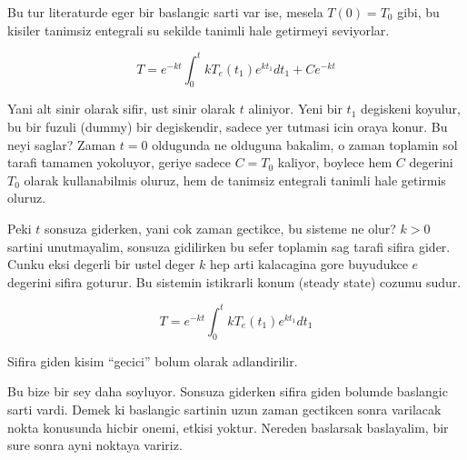 \documentclass[12pt,fleqn]{article}
\begin{document}
Bu tur literaturde eger bir baslangic sarti var ise, mesela $T(0) =
T_0$ gibi, 
bu kisiler tanimsiz entegrali su sekilde tanimli hale getirmeyi seviyorlar. 

\[ T = e^{-kt} \int_0^t kT_e(t_1) e^{kt_1} dt_1 + C e^{-kt} \]

Yani alt sinir olarak sifir, ust sinir olarak $t$ aliniyor. Yeni bir
$t_1$ degiskeni koyulur, bu bir fuzuli (dummy) bir degiskendir, sadece
yer tutmasi icin oraya konur. Bu neyi saglar? Zaman $t=0$ oldugunda ne
olduguna bakalim, o zaman toplamin sol tarafi tamamen yokoluyor,
geriye sadece $C = T_0$ kaliyor, boylece hem $C$ degerini $T_0$ olarak
kullanabilmis oluruz, hem de tanimsiz entegrali tanimli hale getirmis
oluruz. 

Peki $t$ sonsuza giderken, yani cok zaman gectikce, bu sisteme ne
olur? $k > 0$ sartini unutmayalim, sonsuza gidilirken bu sefer
toplamin sag tarafi sifira gider. Cunku eksi degerli bir ustel deger
$k$ hep arti kalacagina gore buyudukce $e$ degerini sifira
goturur. Bu sistemin istikrarli konum (steady state) cozumu sudur.

\[ T = e^{-kt} \int_0^t kT_e(t_1) e^{kt_1} dt_1 \]

Sifira giden kisim ``gecici'' bolum olarak adlandirilir. 

Bu bize bir sey daha soyluyor. Sonsuza giderken sifira giden bolumde
baslangic sarti vardi. Demek ki baslangic sartinin uzun zaman
gectikcen sonra varilacak nokta konusunda hicbir onemi, etkisi
yoktur. Nereden baslarsak baslayalim, bir sure sonra ayni noktaya
variriz. 
\end{document}
